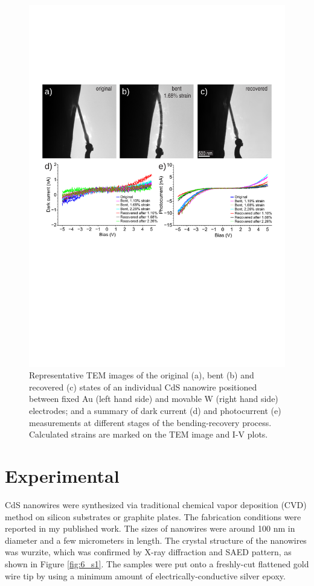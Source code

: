 \begin{figure}  
\includegraphics[width=\textwidth]{figures/figure6_2}
\caption[Deformation and I-V measurements]
{Representative TEM images of the original (a), bent (b) and recovered (c) states of an individual CdS nanowire positioned between fixed Au (left hand side) and movable W (right hand side) electrodes; and a summary of dark current (d) and photocurrent (e) measurements at different stages of the bending-recovery process. Calculated strains are marked on the TEM image and I-V plots. 
\label{fig:6_2}}
\end{figure}

\section{Experimental}
CdS nanowires were synthesized via traditional chemical vapor deposition (CVD) method on silicon substrates or graphite plates. The fabrication conditions were reported in my published work.\cite{Zhang2015} 
The sizes of nanowires were around 100 nm in diameter and a few micrometers in length. 
The crystal structure of the nanowires was wurzite, which was confirmed by X-ray diffraction and SAED pattern, as shown in Figure \ref{fig:6_s1}. 
The samples were put onto a freshly-cut flattened gold wire tip by using a minimum amount of electrically-conductive silver epoxy. \\

